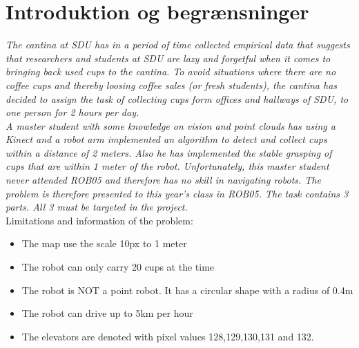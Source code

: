 \section{Introduktion og begrænsninger}
\label{sec:intro}

\textit{
The cantina at SDU has in a period of time collected empirical data that suggests that researchers and students at SDU are lazy and forgetful when it comes to bringing back used cups to the cantina. To avoid situations where there are no coffee cups and thereby loosing coffee sales (or fresh students), the cantina has decided to assign the task of collecting cups form offices and hallways of SDU, to one person for 2 hours per day.\\
A master student with some knowledge on vision and point clouds has using a Kinect and a robot arm implemented an algorithm to detect and collect cups within a distance of 2 meters. Also he has implemented the stable grasping of cups that are within 1 meter of the robot. Unfortunately, this master student never attended ROB05 and therefore has no skill in navigating robots.
The problem is therefore presented to this year’s class in ROB05. The task contains 3 parts. All 3 must be targeted in the project.}\\

Limitations and information of the problem:
\begin{itemize}
\item The map use the scale 10px to 1 meter
\item The robot can only carry 20 cups at the time
\item The robot is NOT a point robot. It has a circular shape with a radius of 0.4m
\item The robot can drive up to 5km per hour
\item The elevators are denoted with pixel values 128,129,130,131 and 132.
\end{itemize}


